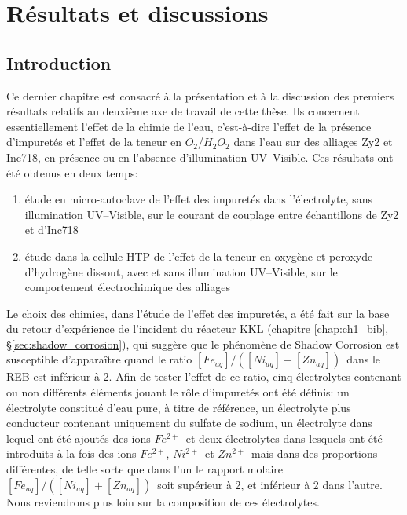 
\newcommand{\FeII}{$Fe^{2+}$}
\newcommand{\NiII}{$Ni^{2+}$}
\newcommand{\ZnII}{$Zn^{2+}$}
\newcommand{\NaSO}{$Na_2SO_4$}
\newcommand{\water}{$H_2O$}
\newcommand{\ratio}{$[Fe_{aq}]/([Ni_{aq}]+[Zn_{aq}])$}
\newcommand{\ratiofrac}{$\frac{[Fe_{aq}]}{[Ni_{aq}]+[Zn_{aq}]}$}
\newcommand{\figwidth}{0.75\textwidth}
\newcommand{\localfigwidth}{0.75\textwidth}


\chapter{Résultats et discussions}\label{chap:ch4_results}
\begin{refsection}
\minitoc


\section{Introduction}\label{sec:ch4_introduction}

    Ce dernier chapitre est consacré à la présentation et à la discussion des premiers 
    résultats relatifs au deuxième axe de travail de cette thèse. Ils concernent essentiellement
    l’effet de la chimie de l’eau, c’est-à-dire l’effet de la présence d’impuretés et l’effet de
    la teneur en $O_2$/$H_2O_2$ dans l’eau sur des alliages Zy2 et Inc718, en présence ou en l’absence
    d’illumination UV--Visible. Ces résultats ont été obtenus en deux temps: 
    
    \begin{enumerate}
        \item étude en micro-autoclave de l'effet des impuretés dans l'électrolyte, sans illumination UV--Visible,
            sur le courant de couplage entre échantillons de Zy2 et d'Inc718
        \item étude dans la cellule HTP de l’effet de la teneur en oxygène et peroxyde d’hydrogène dissout, 
            avec et sans illumination UV--Visible, sur le comportement électrochimique des alliages
    \end{enumerate}

    Le choix des chimies, dans l’étude de l’effet des impuretés, a été fait sur la base du retour d’expérience de l’incident 
    du réacteur KKL (chapitre \ref{chap:ch1_bib}, \S\ref{sec:shadow_corrosion}), qui suggère que le phénomène de Shadow Corrosion est susceptible d’apparaître 
    quand le ratio \ratio\ dans le REB est inférieur à 2. Afin de tester l’effet de ce ratio, cinq électrolytes 
    contenant ou non différents éléments jouant le rôle d’impuretés ont été définis: un électrolyte constitué
    d’eau pure, à titre de référence, un électrolyte plus conducteur contenant uniquement du sulfate de sodium, un
    électrolyte dans lequel ont été ajoutés des ions \FeII\, et deux électrolytes dans lesquels ont été introduits
    à la fois des ions \FeII , \NiII\ et \ZnII\, mais dans des proportions différentes, de telle sorte que dans
    l’un le rapport molaire \ratio\ soit supérieur à 2, et inférieur à 2 dans l’autre.
    Nous reviendrons plus loin sur la composition de ces électrolytes.    
    

\end{refsection}
